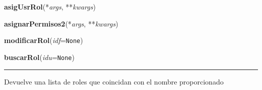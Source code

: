 \hspace{.8\funcindent}\begin{boxedminipage}{\funcwidth}

    \raggedright \textbf{asigUsrRol}(*\textit{args}, **\textit{kwargs})

\setlength{\parskip}{2ex}
\setlength{\parskip}{1ex}
    \end{boxedminipage}

    \label{app:vista:vistaRol:asignarPermisos2}

    \vspace{0.5ex}

\hspace{.8\funcindent}\begin{boxedminipage}{\funcwidth}

    \raggedright \textbf{asignarPermisos2}(*\textit{args}, **\textit{kwargs})

\setlength{\parskip}{2ex}
\setlength{\parskip}{1ex}
    \end{boxedminipage}

    \label{app:vista:vistaRol:modificarRol}

    \vspace{0.5ex}

\hspace{.8\funcindent}\begin{boxedminipage}{\funcwidth}

    \raggedright \textbf{modificarRol}(\textit{idf}={\tt None})

\setlength{\parskip}{2ex}
\setlength{\parskip}{1ex}
    \end{boxedminipage}

    \label{app:vista:vistaRol:buscarRol}

    \vspace{0.5ex}

\hspace{.8\funcindent}\begin{boxedminipage}{\funcwidth}

    \raggedright \textbf{buscarRol}(\textit{idu}={\tt None})

    \vspace{-1.5ex}

    \rule{\textwidth}{0.5\fboxrule}
\setlength{\parskip}{2ex}
    Devuelve una lista de roles que coincidan con el nombre proporcionado

\setlength{\parskip}{1ex}
    \end{boxedminipage}

